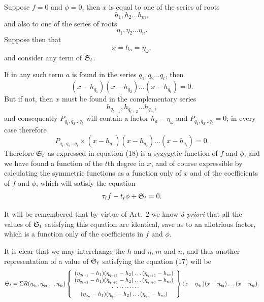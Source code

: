 \documentclass[11pt]{article}
\newcommand{\sourcepage}[1]{\marginpar{\scriptsize p.~#1}}
\begin{document}
Suppose $f=0$ and $\phi=0$, then $x$ is equal to one of the series of roots
\[
h_1,h_2\ldots h_m,
\]
and also to one of the series of roots
\[
\eta_1,\eta_2\ldots\eta_n.
\]
Suppose then that
\[
x=h_a=\eta_\omega,
\]
and consider any term of $\mathfrak{S}_t$.

If in any such term $a$ is found in the series $q_1,q_2\ldots q_t$, then
\[
(x-h_{q_1})(x-h_{q_2})\ldots(x-h_{q_t})=0.
\]
But if not, then $x$ must be found in the complementary series
\[
h_{q_{t+1}},h_{q_{t+2}}\ldots h_{q_m},
\]
and consequently $P_{q_1,q_2\ldots q_t}$ will contain a factor $h_a-\eta_\omega$ and $P_{q_1,q_2\ldots q_t}=0$; in every case therefore
\[
P_{q_1,q_2\ldots q_t}\times(x-h_{q_1})(x-h_{q_2})\ldots(x-h_{q_t})=0.
\]
Therefore $\mathfrak{S}_t$ as expressed in equation (18) is a syzygetic function of $f$ and $\phi$; and we have found a function of the $t$th degree in $x$, and of course expressible by calculating the symmetric functions as a function only of $x$ and of the coefficients of $f$ and $\phi$, which will satisfy the equation
\[
\tau_t f-t_t\phi+\mathfrak{S}_t=0.
\]

\sourcepage{460}
It will be remembered that by virtue of Art.~2 we know \emph{à priori} that all the values of $\mathfrak{S}_t$ satisfying this equation are identical, save as to an allotrious factor, which is a function only of the coefficients in $f$ and $\phi$.

It is clear that we may interchange the $h$ and $\eta$, $m$ and $n$, and thus another representation of a value of $\mathfrak{S}_t$ satisfying the equation (17) will be
\[
\mathfrak{S}_t=\Sigma R(\eta_{q_1},\eta_{q_2}\ldots\eta_{q_t})
\left\{\begin{array}{c}
(\eta_{q_{t+1}}-h_1)(\eta_{q_{t+1}}-h_2)\ldots(\eta_{q_{t+1}}-h_m)\\
(\eta_{q_{t+2}}-h_1)(\eta_{q_{t+2}}-h_2)\ldots(\eta_{q_{t+2}}-h_m)\\
\cdots\cdots\cdots\cdots\\
(\eta_{q_n}-h_1)(\eta_{q_n}-h_2)\ldots(\eta_{q_n}-h_m)
\end{array}\right\}
(x-\eta_{q_1})(x-\eta_{q_2})\ldots(x-\eta_{q_t}).
\]
\end{document}
